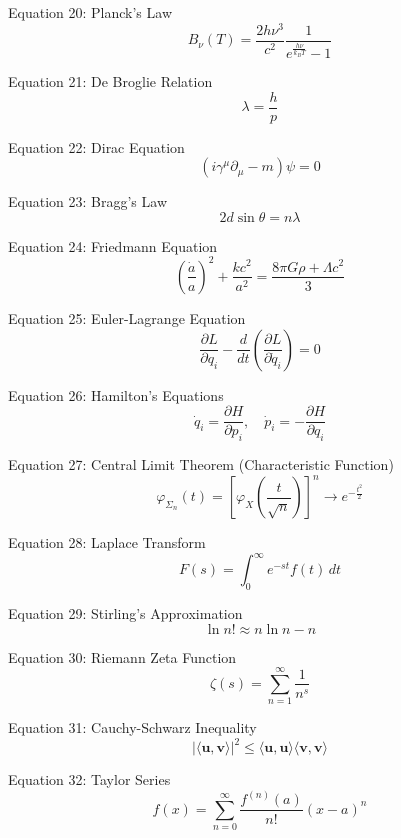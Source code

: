 \documentclass{article}
\begin{document}
Equation 20: Planck's Law
\begin{equation}
B_\nu(T) = \frac{2h\nu^3}{c^2} \frac{1}{e^{\frac{h\nu}{k_B T}} - 1}
\end{equation}

Equation 21: De Broglie Relation
\begin{equation}
\lambda = \frac{h}{p}
\end{equation}

Equation 22: Dirac Equation
\begin{equation}
\left( i \gamma^\mu \partial_\mu - m \right) \psi = 0
\end{equation}

Equation 23: Bragg's Law
\begin{equation}
2d \sin\theta = n\lambda
\end{equation}

Equation 24: Friedmann Equation
\begin{equation}
\left(\frac{\dot{a}}{a}\right)^2 + \frac{kc^2}{a^2} = \frac{8\pi G \rho + \Lambda c^2}{3}
\end{equation}

Equation 25: Euler-Lagrange Equation
\begin{equation}
\frac{\partial L}{\partial q_i} - \frac{d}{dt}\left(\frac{\partial L}{\partial \dot{q}_i}\right) = 0
\end{equation}

Equation 26: Hamilton's Equations
\begin{equation}
\dot{q}_i = \frac{\partial H}{\partial p_i}, \quad \dot{p}_i = -\frac{\partial H}{\partial q_i}
\end{equation}

Equation 27: Central Limit Theorem (Characteristic Function)
\begin{equation}
\varphi_{\Sigma_n}(t) = \left[ \varphi_{X}\left( \frac{t}{\sqrt{n}} \right) \right]^n \to e^{-\frac{t^2}{2}}
\end{equation}

Equation 28: Laplace Transform
\begin{equation}
F(s) = \int_{0}^{\infty} e^{-st} f(t) \, dt
\end{equation}

Equation 29: Stirling's Approximation
\begin{equation}
\ln n! \approx n \ln n - n
\end{equation}

Equation 30: Riemann Zeta Function
\begin{equation}
\zeta(s) = \sum_{n=1}^{\infty} \frac{1}{n^s}
\end{equation}

Equation 31: Cauchy-Schwarz Inequality
\begin{equation}
|\langle \mathbf{u}, \mathbf{v} \rangle|^2 \le \langle \mathbf{u}, \mathbf{u} \rangle \langle \mathbf{v}, \mathbf{v} \rangle
\end{equation}

Equation 32: Taylor Series
\begin{equation}
f(x) = \sum_{n=0}^{\infty} \frac{f^{(n)}(a)}{n!} (x-a)^n
\end{equation}
\end{document}
